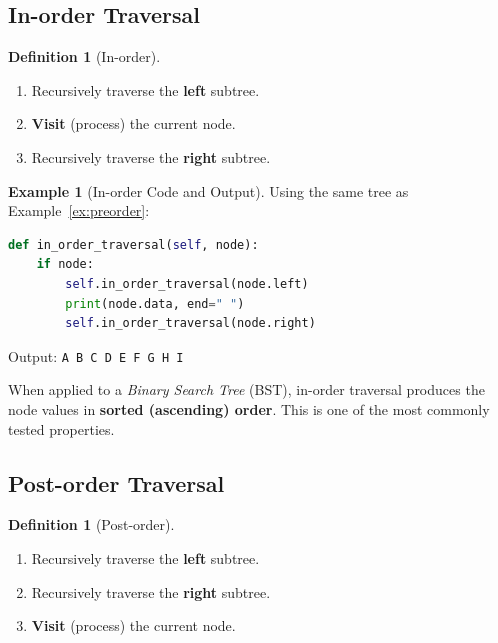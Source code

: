 \documentclass[11pt, a4paper, notitlepage]{report}
\theoremstyle{definition}
\newtheorem{definition}[theorem]{Definition}
\theoremstyle{remark}
\theoremstyle{definition}
\newtheorem{example}[theorem]{Example}
\begin{document}
\subsection{In-order Traversal}
\label{subsec:inorder-bt}

\begin{definition}[In-order]
\label{def:inorder-bt}
\begin{enumerate}
  \item Recursively traverse the \textbf{left} subtree.
  \item \textbf{Visit} (process) the current node.
  \item Recursively traverse the \textbf{right} subtree.
\end{enumerate}
\end{definition}

\begin{example}[In-order Code and Output]
\label{ex:inorder}
Using the same tree as Example~\ref{ex:preorder}:

\begin{lstlisting}[language=Python]
def in_order_traversal(self, node):
    if node:
        self.in_order_traversal(node.left)
        print(node.data, end=" ")
        self.in_order_traversal(node.right)
\end{lstlisting}

Output: \texttt{A B C D E F G H I}
\end{example}

\begin{examtip}[title={Exam Tip: In-order on a BST}]
When applied to a \emph{Binary Search Tree} (BST), in-order traversal produces
the node values in \textbf{sorted (ascending) order}.  This is one of the
most commonly tested properties.
\end{examtip}

\subsection{Post-order Traversal}
\label{subsec:postorder}

\begin{definition}[Post-order]
\label{def:postorder}
\begin{enumerate}
  \item Recursively traverse the \textbf{left} subtree.
  \item Recursively traverse the \textbf{right} subtree.
  \item \textbf{Visit} (process) the current node.
\end{enumerate}
\end{definition}
\end{document}
